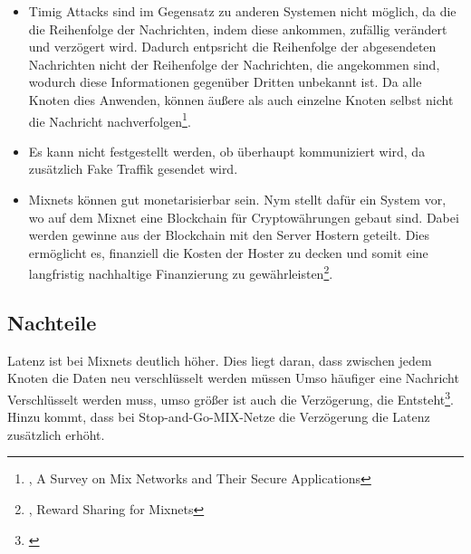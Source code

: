 \begin{itemize}
    \item Timig Attacks sind im Gegensatz zu anderen Systemen nicht möglich, da die die Reihenfolge der Nachrichten, indem diese ankommen, zufällig verändert und verzögert wird. Dadurch entpsricht die Reihenfolge der abgesendeten Nachrichten nicht der Reihenfolge der Nachrichten, die angekommen sind, wodurch diese Informationen gegenüber Dritten unbekannt ist. Da alle Knoten dies Anwenden, können äußere als auch einzelne Knoten selbst nicht die Nachricht nachverfolgen\footnote{\cite{MixNetworksSecureApplications}, A Survey on Mix Networks and Their Secure Applications}.
    \item Es kann nicht festgestellt werden, ob überhaupt kommuniziert wird, da zusätzlich Fake Traffik gesendet wird.
    \item Mixnets können gut monetarisierbar sein. Nym stellt dafür ein System vor, wo auf dem Mixnet eine Blockchain für Cryptowährungen gebaut sind. Dabei werden gewinne aus der Blockchain mit den Server Hostern geteilt. Dies ermöglicht es, finanziell die Kosten der Hoster zu decken und somit eine langfristig nachhaltige Finanzierung zu gewährleisten\footnote{\cite{RewardSharingForMixnets}, Reward Sharing for Mixnets}.
\end{itemize}

\subsection{Nachteile}

Latenz ist bei Mixnets deutlich höher. Dies liegt daran, dass zwischen jedem Knoten die Daten neu verschlüsselt werden müssen Umso häufiger eine Nachricht Verschlüsselt werden muss, umso größer ist auch die Verzögerung, die Entsteht\footnote{\cite{EffectivenessOfMixnets}}. Hinzu kommt, dass bei Stop-and-Go-MIX-Netze die Verzögerung die Latenz zusätzlich erhöht.

